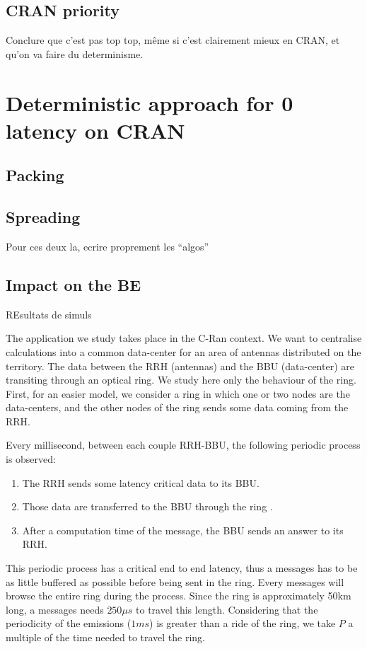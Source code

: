 \documentclass[a4paper,10pt]{article}
\begin{document}
  \subsection{CRAN priority}
  Conclure que c'est pas top top, même si c'est clairement mieux en CRAN, et qu'on va faire du determinisme.

\section{Deterministic approach for 0 latency on CRAN}
  \subsection{Packing}
  \subsection{Spreading}
  Pour ces deux la, ecrire proprement les ``algos''
  \subsection{Impact on the BE}
  REsultats de simuls

The application we study takes place in the C-Ran context. We want to centralise calculations into a common data-center for an area of antennas distributed on the territory. The data between the RRH (antennas) and the BBU (data-center) are transiting through an optical ring. We study here only the behaviour of the ring. First, for an easier model, we consider a ring in which one or two nodes are the data-centers, and the other nodes of the ring sends some data coming from the RRH.

Every millisecond, between each couple RRH-BBU, the following periodic process is observed:
\begin{enumerate}
 \item The RRH sends some latency critical data to its BBU.
 \item Those data are transferred to the BBU through the ring .
 \item After a computation time of the message, the BBU sends an answer to its RRH.
\end{enumerate}
 This periodic process has a critical end to end latency, thus a messages has to be as little buffered as possible before being sent in the ring.
 Every messages will browse the entire ring during the process. Since the ring is approximately 50km long, a messages needs $250 \mu s$ to travel this length.
 Considering that the periodicity of the emissions ($1ms$) is greater than a ride of the ring, we take $P$ a multiple of the time needed to travel the ring.
 
\end{document}
